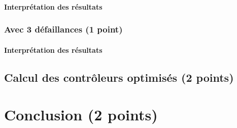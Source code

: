 \documentclass[a4paper]{book}
\begin{document}
\paragraph{Interprétation des résultats}

\subsubsection{Avec 3 défaillances (1 point)}





\paragraph{Interprétation des résultats}

\subsection{Calcul des contrôleurs optimisés (2 points)}

\section{Conclusion (2 points)}
\end{document}

